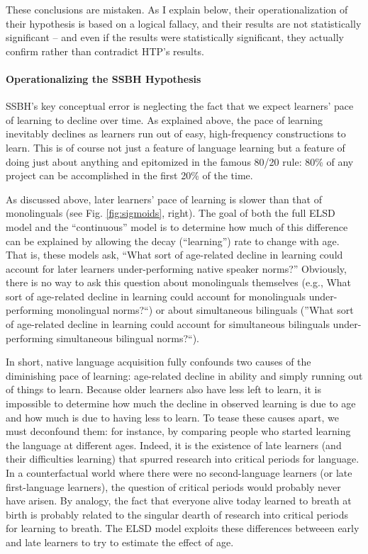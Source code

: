 \documentclass[
  english,
  doc,floatsintext]{apa6}
\let\oldparagraph\paragraph
\renewcommand{\paragraph}[1]{\oldparagraph{#1}\mbox{}}
\begin{document}
These conclusions are mistaken. As I explain below, their operationalization of their hypothesis is based on a logical fallacy, and their results are not statistically significant -- and even if the results were statistically significant, they actually confirm rather than contradict HTP's results.

\hypertarget{operationalizing-the-ssbh-hypothesis}{%
\paragraph{Operationalizing the SSBH Hypothesis}\label{operationalizing-the-ssbh-hypothesis}}

SSBH's key conceptual error is neglecting the fact that we expect learners' pace of learning to decline over time. As explained above, the pace of learning inevitably declines as learners run out of easy, high-frequency constructions to learn. This is of course not just a feature of language learning but a feature of doing just about anything and epitomized in the famous 80/20 rule: 80\% of any project can be accomplished in the first 20\% of the time.

As discussed above, later learners' pace of learning is slower than that of monolinguals (see Fig. \ref{fig:sigmoids}, right). The goal of both the full ELSD model and the ``continuous'' model is to determine how much of this difference can be explained by allowing the decay (``learning'') rate to change with age. That is, these models ask, ``What sort of age-related decline in learning could account for later learners under-performing native speaker norms?'' Obviously, there is no way to ask this question about monolinguals themselves (e.g., What sort of age-related decline in learning could account for monolinguals under-performing monolingual norms?``) or about simultaneous bilinguals (''What sort of age-related decline in learning could account for simultaneous bilinguals under-performing simultaneous bilingual norms?{}``).

In short, native language acquisition fully confounds two causes of the diminishing pace of learning: age-related decline in ability and simply running out of things to learn. Because older learners also have less left to learn, it is impossible to determine how much the decline in observed learning is due to age and how much is due to having less to learn. To tease these causes apart, we must deconfound them: for instance, by comparing people who started learning the language at different ages. Indeed, it is the existence of late learners (and their difficulties learning) that spurred research into critical periods for language. In a counterfactual world where there were no second-language learners (or late first-language learners), the question of critical periods would probably never have arisen. By analogy, the fact that everyone alive today learned to breath at birth is probably related to the singular dearth of research into critical periods for learning to breath. The ELSD model exploits these differences betweeen early and late learners to try to estimate the effect of age.
\end{document}
